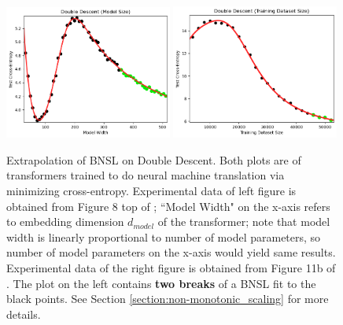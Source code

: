 \documentclass{article} %
\begin{document}
\vspace{-3.5mm}


\FloatBarrier
\begin{figure}[h]%
    \centering


\includegraphics[width=0.49\textwidth]{figures/double_descent/double_descent__model_size.png}
\includegraphics[width=0.49\textwidth]{figures/double_descent/double_descent__dataset_size_1.png}
\vspace{-4.0mm}
    \caption{
    Extrapolation of BNSL on Double Descent. Both plots are of transformers trained to do neural machine translation via minimizing cross-entropy. Experimental data of left figure is obtained from Figure 8 top of \cite{nakkiran2021deep}; ``Model Width" on the x-axis refers to embedding dimension $d_{model}$ of the transformer; note that model width is linearly proportional to number of model parameters, so number of model parameters on the x-axis would yield same results. Experimental data of the right figure is obtained from Figure 11b of \cite{nakkiran2021deep}. The plot on the left contains \textbf{two breaks} of a BNSL fit to the black points. See Section \ref{section:non-monotonic_scaling} for more details.
    }
    \label{fig:double_descent}
\end{figure}

\vspace{-2.5mm}

\FloatBarrier
\end{document}
